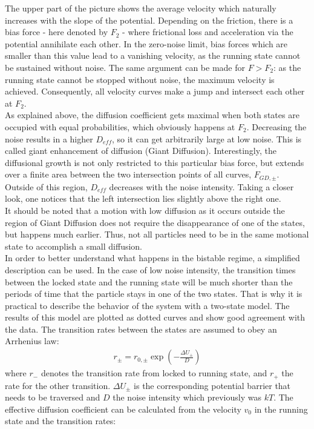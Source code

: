 \documentclass[12pt,a4paper]{article}
\begin{document}
The upper part of the picture shows the average velocity which naturally increases with the slope of the potential. Depending on the friction, there is a bias force - here denoted by $F_2$ - where frictional loss and acceleration via the potential annihilate each other. In the zero-noise limit, bias forces which are smaller than this value lead to a vanishing velocity, as the running state cannot be sustained without noise. The same argument can be made for $F>F_2$: as the running state cannot be stopped without noise, the maximum velocity is achieved. Consequently, all velocity curves make a jump and intersect each other at $F_2$.\\
As explained above, the diffusion coefficient gets maximal when both states are occupied with equal probabilities, which obviously happens at $F_2$. Decreasing the noise results in a higher $D_{eff}$, so it can get arbitrarily large at low noise. This is called giant enhancement of diffusion (Giant Diffusion). Interestingly, the diffusional growth is not only restricted to this particular bias force, but extends over a finite area between the two intersection points of all curves, $F_{GD,\pm}$. Outside of this region, $D_{eff}$ decreases with the noise intensity. Taking a closer look, one notices that the left intersection lies slightly above the right one. \\
It should be noted that a motion with low diffusion as it occurs outside the region of Giant Diffusion does not require the disappearance of one of the states, but happens much earlier. Thus, not all particles need to be in the same motional state to accomplish a small diffusion.\\
In order to better understand what happens in the bistable regime, a simplified description can be used. 
In the case of low noise intensity, the transition times between the locked state and the running state will be much shorter than the periods of time that the particle stays in one of the two states. That is why it is practical to describe the behavior of the system with a two-state model. The results of this model are plotted as dotted curves and show good agreement with the data. The transition rates between the states are assumed to obey an Arrhenius law:
\begin{align}\label{arrhlaw}
r_{\pm}=r_{0,\pm}\exp\left(-\frac{\Delta U_{\pm}}{D}\right)
\end{align}
where $r_-$ denotes the transition rate from locked to running state, and $r_+$ the rate for the other transition. $\Delta U_{\pm}$ is the corresponding potential barrier that needs to be traversed and $D$ the noise intensity which previously was $kT$. The effective diffusion coefficient can be calculated from the velocity $v_0$ in the running state and the transition rates\cite{abp}: 
\end{document}

